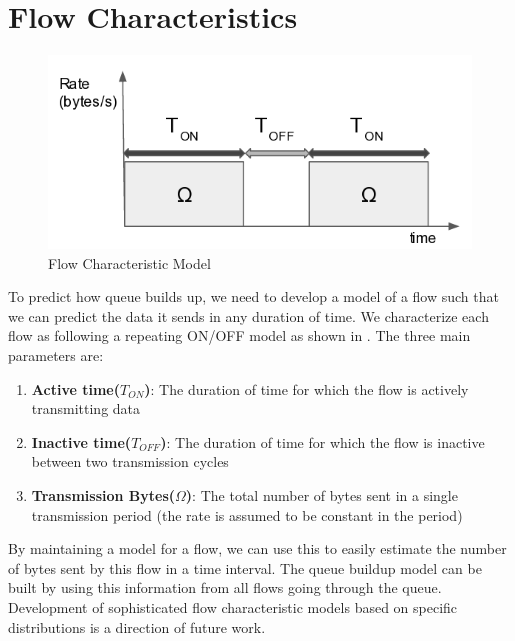 \section{Flow Characteristics}
\begin{figure}[H]
	\centering
	\includegraphics[width=\columnwidth]{flowchar.png}
	\caption{Flow Characteristic Model}
	\label{fig:flowchar}
\end{figure}
To predict how queue builds up, we need to develop a model of a flow 
such that we can predict the data it sends in any duration of time. We 
characterize each flow as following a repeating ON/OFF model \cite{datacentertraffic}
as shown in . The three main parameters are:
\begin{enumerate}
	\item \textbf{Active time($T_{ON}$)}: The duration of time 
	for which the flow is actively transmitting data
	\item \textbf{Inactive time($T_{OFF}$)}: The duration of time 
	for which the flow is inactive between two transmission cycles
	\item \textbf{Transmission Bytes($\Omega$)}: The total number
	of bytes sent in a single transmission period (the rate is assumed
	to be constant in the period)
\end{enumerate}
By maintaining a model for a flow, we can use this to easily estimate
the number of bytes sent by this flow in a time interval. The queue
buildup model can be built by using this information from all flows
going through the queue. Development of sophisticated flow characteristic
models based on specific distributions is a direction of future work. 

